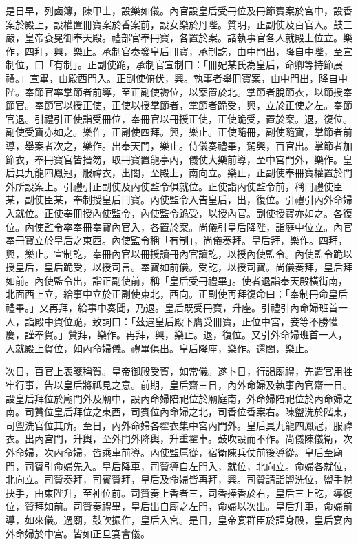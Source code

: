 是日早，列鹵簿，陳甲士，設樂如儀。內官設皇后受冊位及冊節寶案於宮中，設香案於殿上，設權置冊寶案於香案前，設女樂於丹陛。質明，正副使及百官入。鼓三嚴，皇帝袞冕御奉天殿。禮部官奉冊寶，各置於案。諸執事官各人就殿上位立。樂作，四拜，興，樂止。承制官奏發皇后冊寶，承制訖，由中門出，降自中陛，至宣制位，曰「有制」。正副使跪，承制官宣制曰：「冊妃某氏為皇后，命卿等持節展禮。」宣畢，由殿西門入。正副使俯伏，興。執事者舉冊寶案，由中門出，降自中陛。奉節官率掌節者前導，至正副使褥位，以案置於北。掌節者脫節衣，以節授奉節官。奉節官以授正使，正使以授掌節者，掌節者跪受，興，立於正使之左。奉節官退。引禮引正使詣受冊位，奉冊官以冊授正使，正使跪受，置於案。退，復位。副使受寶亦如之。樂作，正副使四拜。興，樂止。正使隨冊，副使隨寶，掌節者前導，舉案者次之，樂作。出奉天門，樂止。侍儀奏禮畢，駕興，百官出。掌節者加節衣，奉冊寶官皆搢笏，取冊寶置龍亭內，儀仗大樂前導，至中宮門外，樂作。皇后具九龍四鳳冠，服禕衣，出閤，至殿上，南向立。樂止，正副使奉冊寶權置於門外所設案上。引禮引正副使及內使監令俱就位。正使詣內使監令前，稱冊禮使臣某，副使臣某，奉制授皇后冊寶。內使監令入告皇后，出，復位。引禮引內外命婦入就位。正使奉冊授內使監令，內使監令跪受，以授內官。副使授寶亦如之。各復位。內使監令率奉冊奉寶內官入，各置於案。尚儀引皇后降陛，詣庭中位立。內官奉冊寶立於皇后之東西。內使監令稱「有制」，尚儀奏拜。皇后拜，樂作。四拜，興，樂止。宣制訖，奉冊內官以冊授讀冊內官讀訖，以授內使監令。內使監令跪以授皇后，皇后跪受，以授司言。奉寶如前儀。受訖，以授司寶。尚儀奏拜，皇后拜如前。內使監令出，詣正副使前，稱「皇后受冊禮畢」。使者退詣奉天殿橫街南，北面西上立，給事中立於正副使東北，西向。正副使再拜復命曰：「奉制冊命皇后禮畢。」又再拜，給事中奏聞，乃退。皇后既受冊寶，升座。引禮引內命婦班首一人，詣殿中賀位跪，致詞曰：「茲遇皇后殿下膺受冊寶，正位中宮，妾等不勝懽慶，謹奉賀。」贊拜，樂作。再拜，興，樂止。退，復位。又引外命婦班首一人，入就殿上賀位，如內命婦儀。禮畢俱出。皇后降座，樂作。還閤，樂止。

次日，百官上表箋稱賀。皇帝御殿受賀，如常儀。遂卜日，行謁廟禮，先遣官用牲牢行事，告以皇后將祗見之意。前期，皇后齋三日，內外命婦及執事內官齋一日。設皇后拜位於廟門外及廟中，設內命婦陪祀位於廟庭南，外命婦陪祀位於內命婦之南。司贊位皇后拜位之東西，司賓位內命婦之北，司香位香案右。陳盥洗於階東，司盥洗官位其所。至日，內外命婦各翟衣集中宮內門外。皇后具九龍四鳳冠，服禕衣。出內宮門，升輿，至外門外降輿，升重翟車。鼓吹設而不作。尚儀陳儀衛，次外命婦，次內命婦，皆乘車前導。內使監扈從，宿衛陳兵仗前後導從。皇后至廟門，司賓引命婦先入。皇后降車，司贊導自左門入，就位，北向立。命婦各就位，北向立。司贊奏拜，司賓贊拜，皇后及命婦皆再拜，興。司贊請詣盥洗位，盥手帨抉手，由東陛升，至神位前。司贊奏上香者三，司香捧香於右，皇后三上訖，導復位，贊拜如前。司贊奏禮畢，皇后出自廟之左門，命婦以次出。皇后升車，命婦前導，如來儀。過廟，鼓吹振作，皇后入宮。是日，皇帝宴群臣於謹身殿，皇后宴內外命婦於中宮。皆如正旦宴會儀。

